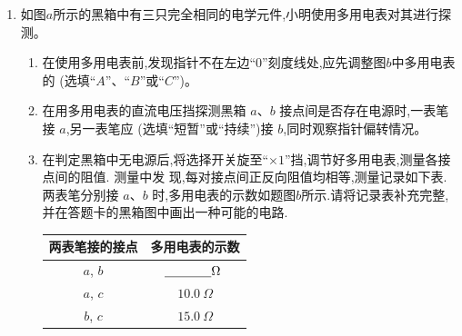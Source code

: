 \begin{enumerate}
\item
{}
如图$ a $所示的黑箱中有三只完全相同的电学元件,小明使用多用电表对其进行探测。
\begin{figure}[h!]
\centering
\begin{subfigure}{0.4\linewidth}
\centering
 
\caption{}\label{}
\end{subfigure}
\begin{subfigure}{0.4\linewidth}
\centering
 
\caption{}\label{}
\end{subfigure}
\end{figure}
\begin{enumerate}
\item
在使用多用电表前,发现指针不在左边“$ 0 $”刻度线处,应先调整图$ b $中多用电表的 \underlinegap 
(选填“$ A $”、“$ B $”或“$ C $”)。

\item 
在用多用电表的直流电压挡探测黑箱 $ a $、$ b $ 接点间是否存在电源时,一表笔接 $ a $,另一表笔应
\underlinegap 
(选填“短暂”或“持续”)接 $ b $,同时观察指针偏转情况。

\item 
在判定黑箱中无电源后,将选择开关旋至“$ \times 1 $”挡,调节好多用电表,测量各接点间的阻值. 测量中发
现,每对接点间正反向阻值均相等,测量记录如下表. 两表笔分别接 $ a $、$ b $ 时,多用电表的示数如题图$ b $所示.请将记录表补充完整,并在答题卡的黑箱图中画出一种可能的电路.
\begin{table}[h!]
\centering 
\begin{tabular}{|c|c|}
\hline 
两表笔接的接点 & 多用电表的示数
\\
\hline
$ a $, $ b $ & $ \underlinegap \Omega $
\\
\hline
$ a $, $ c $ & $ 10.0 \ \Omega $
\\
\hline
$ b $, $ c $ & $ 15.0 \ \Omega $\\ 
\hline 
\end{tabular}
\hfil
\begin{tabular}{c}
 
\end{tabular}
\end{table} 





\end{enumerate}
\end{enumerate}
